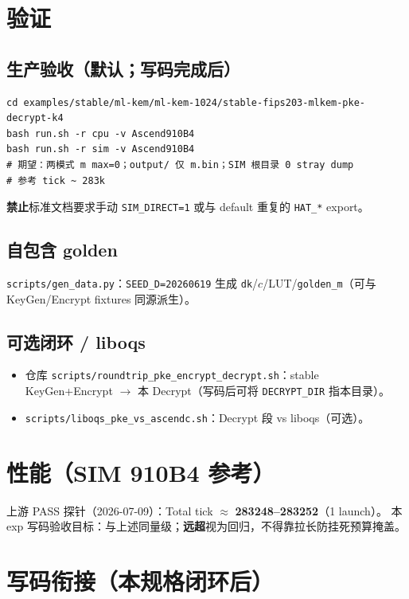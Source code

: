 \documentclass[UTF8,a4paper,11pt]{ctexart}
\begin{document}
\section{验证}
\label{sec:verify}

\subsection{生产验收（默认；写码完成后）}

\begin{verbatim}
cd examples/stable/ml-kem/ml-kem-1024/stable-fips203-mlkem-pke-decrypt-k4
bash run.sh -r cpu -v Ascend910B4
bash run.sh -r sim -v Ascend910B4
# 期望：两模式 m max=0；output/ 仅 m.bin；SIM 根目录 0 stray dump
# 参考 tick ~ 283k
\end{verbatim}

\textbf{禁止}标准文档要求手动 \texttt{SIM\_DIRECT=1} 或与 default 重复的 \texttt{HAT\_*} export。

\subsection{自包含 golden}

\texttt{scripts/gen\_data.py}：\texttt{SEED\_D=20260619} 生成 \texttt{dk}/$c$/LUT/\texttt{golden\_m}（可与 KeyGen/Encrypt fixtures 同源派生）。

\subsection{可选闭环 / liboqs}

\begin{itemize}
  \item 仓库 \texttt{scripts/roundtrip\_pke\_encrypt\_decrypt.sh}：stable KeyGen+Encrypt $\to$ 本 Decrypt（写码后可将 \texttt{DECRYPT\_DIR} 指本目录）。
  \item \texttt{scripts/liboqs\_pke\_vs\_ascendc.sh}：Decrypt 段 vs liboqs（可选）。
\end{itemize}

\section{性能（SIM 910B4 参考）}

上游 PASS 探针（2026-07-09）：Total tick $\approx$ \textbf{283248--283252}（1 launch）。
本 exp 写码验收目标：与上述同量级；\textbf{远超}视为回归，不得靠拉长防挂死预算掩盖。

\section{写码衔接（本规格闭环后）}
\end{document}
